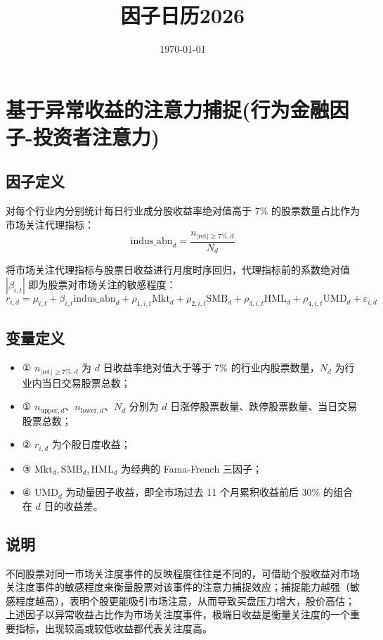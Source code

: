 \documentclass{article}
\title{因子日历2026}
\date{\today}
\begin{document}
\maketitle

\section{基于异常收益的注意力捕捉(行为金融因子-投资者注意力)}

\subsection{因子定义}

对每个行业内分别统计每日行业成分股收益率绝对值高于 7\% 的股票数量占比作为市场关注代理指标：
\begin{equation}
    \mathrm{indus\_abn}_d = \frac{n_{|\mathrm{ret}| \geq 7\%, d}}{N_d}
\end{equation}

将市场关注代理指标与股票日收益进行月度时序回归，代理指标前的系数绝对值 \(|\beta_{i,t}|\) 即为股票对市场关注的敏感程度：
\begin{equation}
    r_{i,d} = \mu_{i,t} + \beta_{i,t} \mathrm{indus\_abn}_d + \rho_{1,i,t} \mathrm{Mkt}_d + \rho_{2,i,t} \mathrm{SMB}_d + \rho_{3,i,t} \mathrm{HML}_d + \rho_{4,i,t} \mathrm{UMD}_d + \varepsilon_{i,d}
\end{equation}

\subsection{变量定义}
\begin{itemize}
    \item ① \( n_{|\mathrm{ret}| \geq 7\%, d} \) 为 \( d \) 日收益率绝对值大于等于 7\% 的行业内股票数量，\( N_d \) 为行业内当日交易股票总数；
    \item ① \(n_{\mathrm{upper},d}\)、\(n_{\mathrm{lower},d}\)、\(N_d\) 分别为 \(d\) 日涨停股票数量、跌停股票数量、当日交易股票总数；
    \item ② \( r_{i,d} \) 为个股日度收益；
    \item ③ \( \mathrm{Mkt}_d, \mathrm{SMB}_d, \mathrm{HML}_d \) 为经典的 Fama-French 三因子；
    \item ④ \( \mathrm{UMD}_d \) 为动量因子收益，即全市场过去 11 个月累积收益前后 30\% 的组合在 \( d \) 日的收益差。
\end{itemize}

\subsection{说明}
不同股票对同一市场关注度事件的反映程度往往是不同的，可借助个股收益对市场关注度事件的敏感程度来衡量股票对该事件的注意力捕捉效应；捕捉能力越强（敏感程度越高），表明个股更能吸引市场注意，从而导致买盘压力增大，股价高估；上述因子以异常收益占比作为市场关注度事件，极端日收益是衡量关注度的一个重要指标，出现较高或较低收益都代表关注度高。
\end{document}
